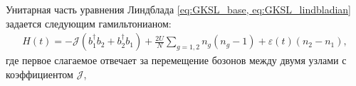 Унитарная часть уравнения Линдблада \cref{eq:GKSL_base, eq:GKSL_lindbladian} задается следующим гамильтонианом:
\begin{equation}
	\label{eq:dimer_H}
	\begin{gathered}
		H(t) = -\mathcal{J} \left(b^\dagger_1 b_2 + b^\dagger_2 b_1\right) + \frac{2 U}{N} \sum_{g=1,2} n_g \left(n_g - 1\right) + \varepsilon(t) \left(n_2 - n_1\right),
	\end{gathered}
\end{equation}
где первое слагаемое отвечает за перемещение бозонов между двумя узлами с коэффициентом \(\mathcal{J}\), 

%
%
%
